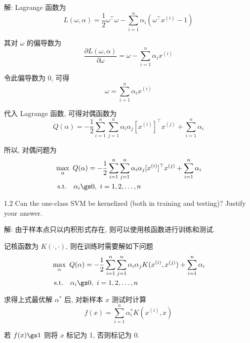 \documentclass[openany]{ctexbook}
\theoremstyle{kaiti}
\theoremstyle{normal}
\begin{document}
解: Lagrange 函数为
\begin{equation}
  L(\omega,\alpha)=\frac{1}{2}\omega^{\top}\omega-\sum_{i=1}^n\alpha_i(\omega^{\top}x^{(i)}-1)
\end{equation}

其对 $\omega$ 的偏导数为
\begin{equation}
  \frac{\partial L(\omega,\alpha)}{\partial \omega}=\omega-\sum_{i=1}^n\alpha_ix^{(i)}
\end{equation}

令此偏导数为 0, 可得
\begin{equation}
  \omega=\sum_{i=1}^n\alpha_ix^{(i)}
\end{equation}

代入 Lagrange 函数, 可得对偶函数为
\begin{equation}
  Q(\alpha)=-\frac{1}{2}\sum_{i=1}^n\sum_{j=1}^n\alpha_i\alpha_j[x^{(i)}]^{\top}x^{(j)}+\sum_{i=1}^n\alpha_i
\end{equation}

所以, 对偶问题为
\begin{equation}
  \begin{aligned}
    &\max_\alpha~Q(\alpha)=-\frac{1}{2}\sum_{i=1}^n\sum_{j=1}^n\alpha_i\alpha_j[x^{(i)}]^{\top}x^{(j)}+\sum_{i=1}^n\alpha_i\\
    &~\mathrm{s.t.}\quad\alpha_i\gs0,~i=1,2,\dots,n
  \end{aligned}
\end{equation}

1.2 Can the one-class SVM be kernelized (both in training and testing)? Justify your answer.

解: 由于样本点只以内积形式存在, 则可以使用核函数进行训练和测试.

记核函数为 $K(\cdot,\cdot)$, 则在训练时需要解如下问题
\begin{equation}
  \begin{aligned}
    &\max_\alpha~Q(\alpha)=-\frac{1}{2}\sum_{i=1}^n\sum_{j=1}^n\alpha_i\alpha_jK(x^{(i)},x^{(j)})+\sum_{i=1}^n\alpha_i\\
    &~\mathrm{s.t.}\quad\alpha_i\gs0,~i=1,2,\dots,n
  \end{aligned}
\end{equation}

求得上式最优解 $\alpha^*$ 后, 对新样本 $x$ 测试时计算
\begin{equation}
  f(x)=\sum_{i=1}^n\alpha^*_iK(x^{(i)},x)
\end{equation}

若 $f(x)\gs1$ 则将 $x$ 标记为 1, 否则标记为 0.
\end{document}
